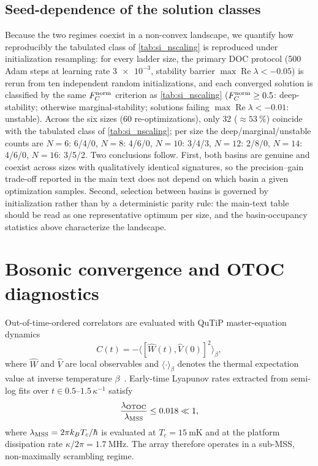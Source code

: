 \documentclass[aps,prxquantum,preprint,superscriptaddress,amsmath,amssymb]{revtex4-2}
\providecommand{\ev}[1]{\langle #1 \rangle}
\newcommand{\Real}{\operatorname{Re}}
\newcommand{\Fnorm}{F_C^{\rm norm}}
\begin{document}
\subsection{Seed-dependence of the solution classes}
\label{sec:si_seed_dependence}

Because the two regimes coexist in a non-convex landscape, we quantify how reproducibly the tabulated class of \cref{tab:si_nscaling} is reproduced under initialization resampling: for every ladder size, the primary DOC protocol (500 Adam steps at learning rate $\num{3e-3}$, stability barrier $\max\Real\lambda<\num{-0.05}$) is rerun from ten independent random initializations, and each converged solution is classified by the same $\Fnorm$ criterion as \cref{tab:si_nscaling} ($\Fnorm\ge\num{0.5}$: deep-stability; otherwise marginal-stability; solutions failing $\max\Real\lambda<\num{-0.01}$: unstable). Across the six sizes (\num{60} re-optimizations), only \num{32} ($\approx\qty{53}{\percent}$) coincide with the tabulated class of \cref{tab:si_nscaling}; per size the deep/marginal/unstable counts are $N=\num{6}$: \num{6}/\num{4}/\num{0}, $N=\num{8}$: \num{4}/\num{6}/\num{0}, $N=\num{10}$: \num{3}/\num{4}/\num{3}, $N=\num{12}$: \num{2}/\num{8}/\num{0}, $N=\num{14}$: \num{4}/\num{6}/\num{0}, $N=\num{16}$: \num{3}/\num{5}/\num{2}. Two conclusions follow. First, both basins are genuine and coexist across sizes with qualitatively identical signatures, so the precision--gain trade-off reported in the main text does not depend on which basin a given optimization samples. Second, selection between basins is governed by initialization rather than by a deterministic parity rule: the main-text table should be read as one representative optimum per size, and the basin-occupancy statistics above characterize the landscape.

\section{Bosonic convergence and OTOC diagnostics}
\label{sec:si_otoc}

Out-of-time-ordered correlators are evaluated with QuTiP master-equation dynamics
\begin{equation}
C(t)=-\ev{[\hat{W}(t),\hat{V}(0)]^2}_\beta,
\end{equation}
where $\hat{W}$ and $\hat{V}$ are local observables and $\ev{\cdot}_\beta$ denotes the thermal expectation value at inverse temperature $\beta$~\citep{Maldacena2016}. Early-time Lyapunov rates extracted from semi-log fits over $t\in\numrange{0.5}{1.5}\,\kappa^{-1}$ satisfy
\begin{equation}
\frac{\lambda_{\rm OTOC}}{\lambda_{\rm MSS}}\le\num{0.018}\ll\num{1},
\end{equation}
where $\lambda_{\rm MSS}=2\pi k_B T_c/\hbar$ is evaluated at $T_c=\qty{15}{\milli\kelvin}$ and at the platform dissipation rate $\kappa/2\pi=\qty{1.7}{\mega\hertz}$. The array therefore operates in a sub-MSS, non-maximally scrambling regime.
\end{document}
